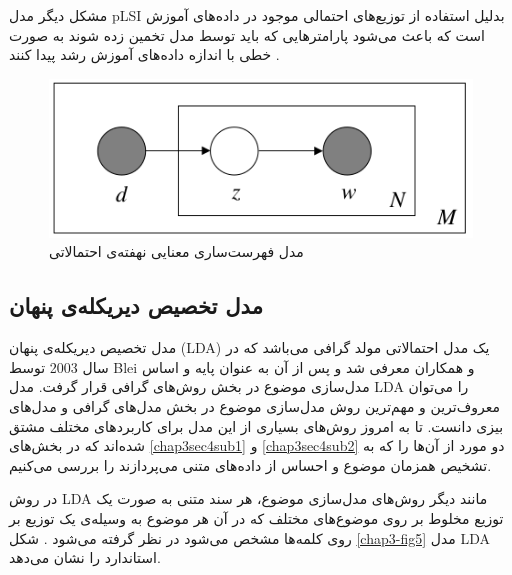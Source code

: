 	مشکل دیگر مدل
	pLSI
	بدلیل استفاده از توزیع‌های احتمالی‌ موجود در داده‌های آموزش است که باعث می‌‌شود پارامترهایی که باید توسط مدل تخمین زده شوند به صورت خطی با اندازه داده‌های آموزش رشد پیدا کنند
	\cite{blei2003latent}.
	\begin{figure}
		\centering
		\includegraphics[scale=0.4]{chap3-img/pLSI}
		\caption{مدل فهرست‌ساری معنایی نهفته‌ی احتمالاتی \cite{blei2003latent}}
		\label{chap3-fig4}
	\end{figure}
	
	
	\subsection{مدل تخصیص دیریکله‌ی پنهان}
	\label{chap3sec3sub4}
	مدل تخصیص دیریکله‌ی پنهان 
	(LDA)
	یک مدل احتمالاتی مولد گرافی می‌باشد که در سال 2003 توسط 
	Blei 
	و همکاران
	\cite{blei2003latent}
	معرفی شد و پس از آن به عنوان پایه و اساس مدل‌سازی موضوع در بخش روش‌های گرافی‌ قرار گرفت. مدل
	LDA
	 را می‌‌توان معروف‌ترین و مهم‌ترین روش مدل‌سازی موضوع در بخش مدل‌های گرافی‌ و مدل‌های بیزی دانست. تا به امروز روش‌های بسیاری از این مدل برای کاربرد‌های مختلف مشتق شده‌اند که در بخش‌های
	 \ref{chap3sec4sub1}
	 و
	 \ref{chap3sec4sub2}
	 دو مورد از آن‌ها را که به تشخیص همزمان موضوع و احساس از داده‌های متنی می‌‌پردازند را بررسی‌ می‌‌کنیم.
	 
	 
	 
	 در روش  
	LDA
	مانند دیگر روش‌های مدل‌سازی موضوع، هر سند متنی به صورت یک توزیع مخلوط بر روی موضوع‌های مختلف‌ که در آن هر موضوع به وسیله‌ی یک توزیع بر روی کلمه‌ها مشخص می‌‌شود در نظر گرفته می‌شود
	\cite{blei2003latent}.
	شکل
	\ref{chap3-fig5}
	مدل
	LDA
	استاندارد را نشان می‌‌دهد.	
	

